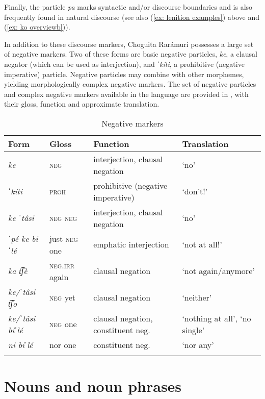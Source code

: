 Finally, the particle \textit{pa} marks syntactic and/or discourse boundaries and is also frequently found in natural discourse (see also (\ref{ex: lenition examples}) above and (\ref{ex: ko overviewb})).

In addition to these discourse markers, Choguita Rarámuri possesses a large set of negative markers. Two of these forms are basic negative particles, \textit{ke}, a clausal negator (which can be used as interjection), and \textit{ˈkíti}, a prohibitive (negative imperative) particle. Negative particles may combine with other morphemes, yielding morphologically complex negative markers. The set of negative particles and complex negative markers available in the language are provided in , with their gloss, function and approximate translation.


\begin{table}
\caption{Negative markers}
\label{tab:key:3}

\begin{tabularx}{\textwidth}{llQQ}
\lsptoprule
\textbf{Form} & \textbf{Gloss} & \textbf{Function} & \textbf{Translation}\\
\midrule
\textit{ke} & \textsc{neg} & interjection, clausal negation & ‘no’\\
\textit{ˈkíti} & \textsc{proh} & prohibitive (negative imperative) & `don't!'\\
\textit{ke ˈtâsi} & \textsc{neg neg} & interjection, clausal negation & ‘no’\\
\textit{ˈpé ke biˈlé} & just \textsc{neg} one & emphatic interjection & `not at all!'\\
\textit{ka t͡ʃè} & \textsc{neg.irr} again & clausal negation &`not again/anymore’\\
\textit{ke/ˈtâsi t͡ʃo} & \textsc{neg} yet & clausal negation & `neither’\\
\textit{ke/ˈtâsi biˈlé} & \textsc{neg} one & clausal negation, constituent neg. & ‘nothing at all’, ‘no single’\\
\textit{ni biˈlé} & nor one & constituent neg. & ‘nor any’\\
\lspbottomrule
\end{tabularx}
\end{table}


\section{Nouns and noun phrases}
\label{sec: nouns}

